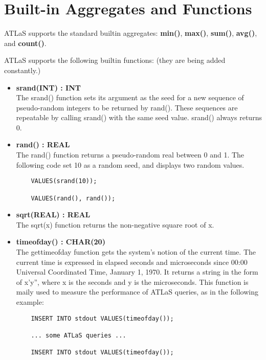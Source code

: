 \section{Built-in Aggregates and Functions}
ATLaS supports the standard builtin aggregates: {\bf min()}, {\bf
  max()}, {\bf sum()}, {\bf avg()}, and {\bf count()}.

ATLaS supports the following builtin functions: (they are being added
constantly.)

\begin{itemize}
\item {\bf srand(INT) : INT} \\
  The srand() function sets its argument as the seed for a new
  sequence of pseudo-random integers to be returned by rand().  These
  sequences are repeatable by calling srand() with the same seed
  value. srand() always returns 0.

\item {\bf rand() : REAL} \\
  The rand() function returns a pseudo-random real between 0 and 1.
  The following code set 10 as a random seed, and displays two random
  values.
\begin{verbatim}
    VALUES(srand(10));

    VALUES(rand(), rand());
\end{verbatim}

\item {\bf sqrt(REAL) : REAL}\\
  The sqrt(x) function returns the non-negative square root of x.  \\

\item {\bf timeofday() : CHAR(20)}\\
  The gettimeofday function gets the system's notion of the current
  time. The current time is expressed in elapsed seconds and
  microseconds since 00:00 Universal Coordinated Time, January 1,
  1970. It returns a string in the form of x'y'', where x is the
  seconds and y is the microseconds. This function is maily used to
  measure the performance of ATLaS queries, as in the following example:

\begin{verbatim}
    INSERT INTO stdout VALUES(timeofday());

    ... some ATLaS queries ...

    INSERT INTO stdout VALUES(timeofday());
\end{verbatim}
\end{itemize}
